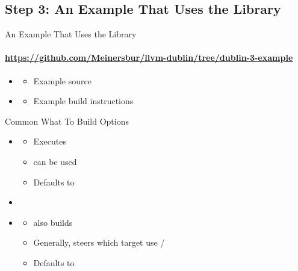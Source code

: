\subsection{Step 3: An Example That Uses the Library}
\begin{frame}[fragile]{An Example That Uses the Library}
\framesubtitle{\url{https://github.com/Meinersbur/llvm-dublin/tree/dublin-3-example}}
\begin{itemize}
\item[\pgfuseimage{file}] 
  \begin{itemize}
  \item Example source
  \end{itemize}
\item[\pgfuseimage{file}] 
  \begin{itemize}
  \item Example build instructions
  \end{itemize}
\end{itemize}
\end{frame}



\begin{frame}[fragile]{Common What To Build Options}
\begin{itemize}
\item {}
  \begin{itemize}
  \item Executes 
  \item {} can be used
  \item Defaults to 
  \end{itemize}
\item[]
\item {}
  \begin{itemize}
  \item {} also builds  
  \item Generally, steers which target use /
  \item Defaults to 
  \end{itemize}
\end{itemize}
\end{frame}



